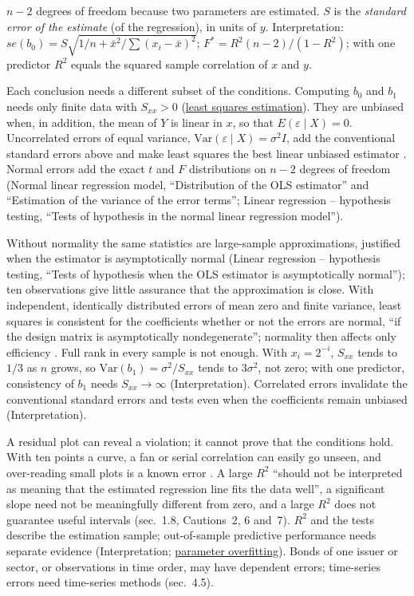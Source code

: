 \begin{qfmethod}
 $n-2$ degrees of freedom because two parameters are estimated. $S$ is the \emph{standard error of the estimate} (of the regression), in units of $y$. Interpretation: $se(b_0)=S\sqrt{1/n+\bar x^2/\sum(x_i-\bar x)^2}$; $F^*=R^2(n-2)/(1-R^2)$; with one predictor $R^2$ equals the squared sample correlation of $x$ and $y$.

 Each conclusion needs a different subset of the conditions. Computing $b_0$ and $b_1$ needs only finite data with $S_{xx}>0$ (\hyperref[meth:simple-regression-estimation]{least squares estimation}). They are unbiased when, in addition, the mean of $Y$ is linear in $x$, so that $E(\varepsilon\mid X)=0$. Uncorrelated errors of equal variance, $\mathrm{Var}(\varepsilon\mid X)=\sigma^2I$, add the conventional standard errors above and make least squares the best linear unbiased estimator \citep[Gauss--Markov theorem, ``Assumptions'', ``OLS is linear and unbiased'' and ``The covariance matrix of the OLS estimator'']{linear-regression-lectures}. Normal errors add the exact $t$ and $F$ distributions on $n-2$ degrees of freedom (Normal linear regression model, ``Distribution of the OLS estimator'' and ``Estimation of the variance of the error terms''; Linear regression -- hypothesis testing, ``Tests of hypothesis in the normal linear regression model'').

Without normality the same statistics are large-sample approximations, justified when the estimator is asymptotically normal (Linear regression -- hypothesis testing, ``Tests of hypothesis when the OLS estimator is asymptotically normal''); ten observations give little assurance that the approximation is close. With independent, identically distributed errors of mean zero and finite variance, least squares is consistent for the coefficients whether or not the errors are normal, ``if the design matrix is asymptotically nondegenerate''; normality then affects only efficiency \citep[sec.~2, pp.~605--606]{smearing-retransformation-1983}. Full rank in every sample is not enough. With $x_i=2^{-i}$, $S_{xx}$ tends to $1/3$ as $n$ grows, so $\mathrm{Var}(b_1)=\sigma^2/S_{xx}$ tends to $3\sigma^2$, not zero; with one predictor, consistency of $b_1$ needs $S_{xx}\to\infty$ (Interpretation). Correlated errors invalidate the conventional standard errors and tests even when the coefficients remain unbiased (Interpretation).

A residual plot can reveal a violation; it cannot prove that the conditions hold. With ten points a curve, a fan or serial correlation can easily go unseen, and over-reading small plots is a known error \citep[sec.~4.2]{regression-methods-course-notes}. A large $R^2$ ``should not be interpreted as meaning that the estimated regression line fits the data well'', a significant slope need not be meaningfully different from zero, and a large $R^2$ does not guarantee useful intervals (sec.~1.8, Cautions~2, 6 and~7). $R^2$ and the tests describe the estimation sample; out-of-sample predictive performance needs separate evidence (Interpretation; \hyperref[pit:parameter-overfitting]{parameter overfitting}). Bonds of one issuer or sector, or observations in time order, may have dependent errors; time-series errors need time-series methods (sec.~4.5).


\end{qfmethod}
